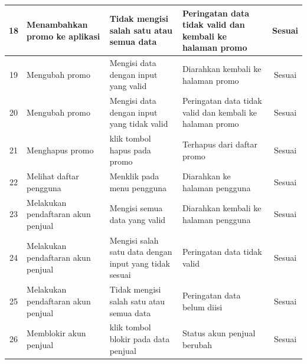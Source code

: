 \begin{longtable}{| m{0.5cm} | m{3.2cm} | m{3.4cm} | m{3.3cm} | m{1.6cm} |}
	\hline
	\multicolumn{1}{|c|}{{\footnotesize 18}} & {\footnotesize Menambahkan promo ke aplikasi} & {\footnotesize Tidak mengisi salah satu atau semua data} & {\footnotesize Peringatan data tidak valid dan kembali ke halaman promo} & \multicolumn{1}{|c|}{{\footnotesize Sesuai}}\\
	\hline
	\multicolumn{1}{|c|}{{\footnotesize 19}} & {\footnotesize Mengubah promo} & {\footnotesize Mengisi data dengan input yang valid} & {\footnotesize Diarahkan kembali ke halaman promo} & \multicolumn{1}{|c|}{{\footnotesize Sesuai}}\\
	\hline
	\multicolumn{1}{|c|}{{\footnotesize 20}} & {\footnotesize Mengubah promo} & {\footnotesize Mengisi data dengan input yang tidak valid} & {\footnotesize Peringatan data tidak valid dan kembali ke halaman promo} & \multicolumn{1}{|c|}{{\footnotesize Sesuai}}\\
	\hline
	\multicolumn{1}{|c|}{{\footnotesize 21}} & {\footnotesize Menghapus promo} & {\footnotesize klik tombol hapus pada promo} & {\footnotesize Terhapus dari daftar promo} & \multicolumn{1}{|c|}{{\footnotesize Sesuai}}\\
	\hline
	\multicolumn{1}{|c|}{{\footnotesize 22}} & {\footnotesize Melihat daftar pengguna} & {\footnotesize Menklik pada menu pengguna} & {\footnotesize Diarahkan ke halaman pengguna} & \multicolumn{1}{|c|}{{\footnotesize Sesuai}}\\
	\hline
	\multicolumn{1}{|c|}{{\footnotesize 23}} & {\footnotesize Melakukan pendaftaran akun penjual} & {\footnotesize Mengisi semua data yang valid} & {\footnotesize Diarahkan kembali ke halaman pengguna} & \multicolumn{1}{|c|}{{\footnotesize Sesuai}}\\
	\hline
	\multicolumn{1}{|c|}{{\footnotesize 24}} & {\footnotesize Melakukan pendaftaran akun penjual} & {\footnotesize Mengisi salah satu data dengan input yang tidak sesuai} & {\footnotesize Peringatan data tidak valid} & \multicolumn{1}{|c|}{{\footnotesize Sesuai}}\\
	\hline
	\multicolumn{1}{|c|}{{\footnotesize 25}} & {\footnotesize Melakukan pendaftaran akun penjual} & {\footnotesize Tidak mengisi salah satu atau semua data} & {\footnotesize Peringatan data belum diisi} & \multicolumn{1}{|c|}{{\footnotesize Sesuai}}\\
	\hline
	\multicolumn{1}{|c|}{{\footnotesize 26}} & {\footnotesize Memblokir akun penjual} & {\footnotesize klik tombol blokir pada data penjual} & {\footnotesize Status akun penjual berubah} & \multicolumn{1}{|c|}{{\footnotesize Sesuai}}\\

\end{longtable}
